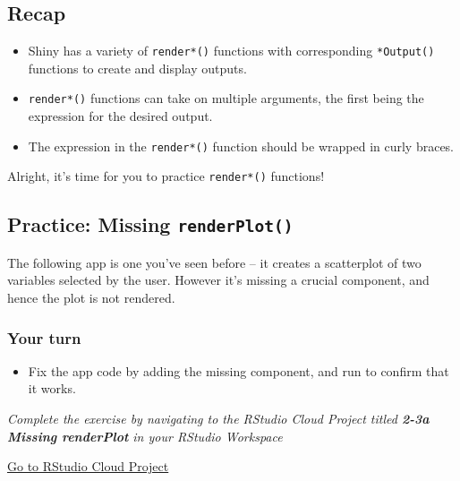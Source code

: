 \documentclass[
  letterpaper,
  DIV=11,
  numbers=noendperiod]{scrreprt}
\providecommand{\tightlist}{%
  \setlength{\itemsep}{0pt}\setlength{\parskip}{0pt}}
\begin{document}
\hypertarget{recap-4}{%
\subsection{Recap}\label{recap-4}}

\begin{itemize}
\item
  Shiny has a variety of \texttt{render*()} functions with corresponding
  \texttt{*Output()} functions to create and display outputs.
\item
  \texttt{render*()} functions can take on multiple arguments, the first
  being the expression for the desired output.
\item
  The expression in the \texttt{render*()} function should be wrapped in
  curly braces.
\end{itemize}

Alright, it's time for you to practice \texttt{render*()} functions!

\hypertarget{practice-missing-renderplot}{%
\subsection{\texorpdfstring{Practice: Missing
\texttt{renderPlot()}}{Practice: Missing renderPlot()}}\label{practice-missing-renderplot}}

The following app is one you've seen before -- it creates a scatterplot
of two variables selected by the user. However it's missing a crucial
component, and hence the plot is not rendered.

\hypertarget{your-turn-14}{%
\subsubsection{Your turn}\label{your-turn-14}}

\begin{itemize}
\tightlist
\item
  Fix the app code by adding the missing component, and run to confirm
  that it works.
\end{itemize}

\emph{Complete the exercise by navigating to the RStudio Cloud Project
titled \textbf{2-3a Missing renderPlot} in your RStudio Workspace}

\href{https://rstudio.cloud/spaces/81721/join?access_code=I4VJaNsKfTqR3Td9hLP7E1nz8\%2FtMg6Xbw9Bgqumv}{
Go to RStudio Cloud Project}
\end{document}
